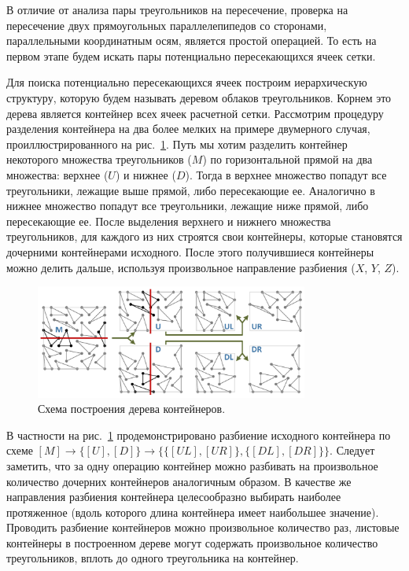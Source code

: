 В отличие от анализа пары треугольников на пересечение, проверка на пересечение двух прямоугольных параллелепипедов со сторонами, параллельными координатным осям, является простой операцией.
То есть на первом этапе будем искать пары потенциально пересекающихся ячеек сетки.

Для поиска потенциально пересекающихся ячеек построим иерархическую структуру, которую будем называть деревом облаков треугольников.
Корнем это дерева является контейнер всех ячеек расчетной сетки.
Рассмотрим процедуру разделения контейнера на два более мелких на примере двумерного случая, проиллюстрированного на рис.~\ref{fig:text_1_int_box_tree}.
Путь мы хотим разделить контейнер некоторого множества треугольников ($M$) по горизонтальной прямой на два множества: верхнее ($U$) и нижнее ($D$).
Тогда в верхнее множество попадут все треугольники, лежащие выше прямой, либо пересекающие ее.
Аналогично в нижнее множество попадут все треугольники, лежащие ниже прямой, либо пересекающие ее.
После выделения верхнего и нижнего множества треугольников, для каждого из них строятся свои контейнеры, которые становятся дочерними контейнерами исходного.
После этого получившиеся контейнеры можно делить дальше, используя произвольное направление разбиения ($X$, $Y$, $Z$).

\begin{figure}[ht]
\centering
\includegraphics[width=0.8\textwidth]{fig/int_box.pdf}
\singlespacing
{}\caption{Схема построения дерева контейнеров.}\label{fig:text_1_int_box_tree}
\end{figure}

В частности на рис.~\ref{fig:text_1_int_box_tree} продемонстрировано разбиение исходного контейнера по схеме $[M] \rightarrow \{[U], [D]\} \rightarrow \{\{[UL], [UR]\}, \{[DL], [DR]\}\}$.
Следует заметить, что за одну операцию контейнер можно разбивать на произвольное количество дочерних контейнеров аналогичным образом.
В качестве же направления разбиения контейнера целесообразно выбирать наиболее протяженное (вдоль которого длина контейнера имеет наибольшее значение).
Проводить разбиение контейнеров можно произвольное количество раз, листовые контейнеры в построенном дереве могут содержать произвольное количество треугольников, вплоть до одного треугольника на контейнер.


